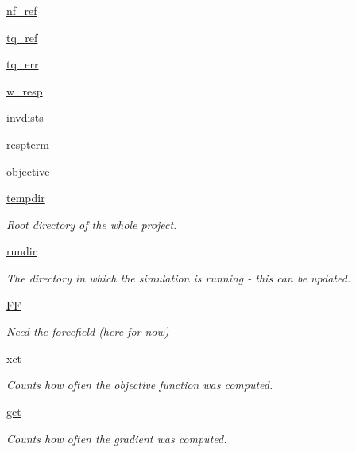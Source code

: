 \begin{DoxyCompactItemize}
\hyperlink{classforcebalance_1_1abinitio_1_1AbInitio_ad83ddb614190a3c3e647060ce3e063ad}{nf\-\_\-ref}
\item 
\hyperlink{classforcebalance_1_1abinitio_1_1AbInitio_a35ffa4510b557dd4fbce2cd8276fa09b}{tq\-\_\-ref}
\item 
\hyperlink{classforcebalance_1_1abinitio_1_1AbInitio_a36857e469f48d8bddbd3b288a92cac10}{tq\-\_\-err}
\item 
\hyperlink{classforcebalance_1_1abinitio_1_1AbInitio_ab949767e48e84f747f0e84c304d80004}{w\-\_\-resp}
\item 
\hyperlink{classforcebalance_1_1abinitio_1_1AbInitio_ac90a96916a049717e14bc1f757577f24}{invdists}
\item 
\hyperlink{classforcebalance_1_1abinitio_1_1AbInitio_ac4f8e85daeccb2e46b724eddc76d38e1}{respterm}
\item 
\hyperlink{classforcebalance_1_1abinitio_1_1AbInitio_ae27974d01fbc7d485ce3e049a54943bc}{objective}
\item 
\hyperlink{classforcebalance_1_1target_1_1Target_aede2856573b890cd47054ad36937d6f6}{tempdir}
\begin{DoxyCompactList}\small\item\em \-Root directory of the whole project. \end{DoxyCompactList}\item 
\hyperlink{classforcebalance_1_1target_1_1Target_a1da470037ef61c22dc44beb85cfa01a9}{rundir}
\begin{DoxyCompactList}\small\item\em \-The directory in which the simulation is running -\/ this can be updated. \end{DoxyCompactList}\item 
\hyperlink{classforcebalance_1_1target_1_1Target_a796dc30a19a60c63fb43b088d40a963f}{\-F\-F}
\begin{DoxyCompactList}\small\item\em \-Need the forcefield (here for now) \end{DoxyCompactList}\item 
\hyperlink{classforcebalance_1_1target_1_1Target_ad4cd0ab38d8fc97d3e7a6e22ce130a16}{xct}
\begin{DoxyCompactList}\small\item\em \-Counts how often the objective function was computed. \end{DoxyCompactList}\item 
\hyperlink{classforcebalance_1_1target_1_1Target_aff6e42b84dd8eb5a4dc3b47aa58bc64c}{gct}
\begin{DoxyCompactList}\small\item\em \-Counts how often the gradient was computed. \end{DoxyCompactList}\item 

\end{DoxyCompactItemize}
